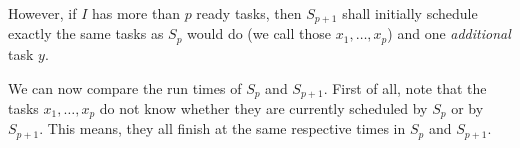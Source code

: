   However, if $I$ has more than $p$ ready tasks, then $S_{p+1}$ shall initially schedule exactly the same tasks as $S_p$ would do (we call those $x_1,\dots,x_p$) and one \emph{additional} task $y$.

  We can now compare the run times of $S_p$ and $S_{p+1}$. First of all, note that the tasks $x_1,\dots,x_p$ do not know whether they are currently scheduled by $S_p$ or by $S_{p+1}$. This means, they all finish at the same respective times in $S_p$ and $S_{p+1}$. 




